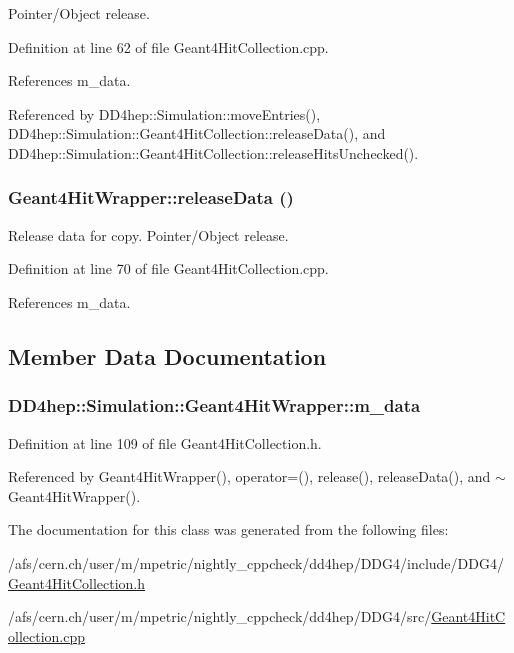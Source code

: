 Pointer/Object release. 

Definition at line 62 of file Geant4HitCollection.cpp.

References m\_\-data.

Referenced by DD4hep::Simulation::moveEntries(), DD4hep::Simulation::Geant4HitCollection::releaseData(), and DD4hep::Simulation::Geant4HitCollection::releaseHitsUnchecked().\hypertarget{class_d_d4hep_1_1_simulation_1_1_geant4_hit_wrapper_acec7d2a18d078071d5714dd4a0c45739}{
\subsubsection[{releaseData}]{ Geant4HitWrapper::releaseData ()}}
\label{class_d_d4hep_1_1_simulation_1_1_geant4_hit_wrapper_acec7d2a18d078071d5714dd4a0c45739}


Release data for copy. Pointer/Object release. 

Definition at line 70 of file Geant4HitCollection.cpp.

References m\_\-data.

\subsection{Member Data Documentation}
\hypertarget{class_d_d4hep_1_1_simulation_1_1_geant4_hit_wrapper_a2344f57f3d02ecd148c2b4893dffe660}{
\subsubsection[{m\_\-data}]{ {\bf DD4hep::Simulation::Geant4HitWrapper::m\_\-data}}}
\label{class_d_d4hep_1_1_simulation_1_1_geant4_hit_wrapper_a2344f57f3d02ecd148c2b4893dffe660}


Definition at line 109 of file Geant4HitCollection.h.

Referenced by Geant4HitWrapper(), operator=(), release(), releaseData(), and $\sim$Geant4HitWrapper().

The documentation for this class was generated from the following files:\begin{DoxyCompactItemize}
\item 
/afs/cern.ch/user/m/mpetric/nightly\_\-cppcheck/dd4hep/DDG4/include/DDG4/\hyperlink{_geant4_hit_collection_8h}{Geant4HitCollection.h}\item 
/afs/cern.ch/user/m/mpetric/nightly\_\-cppcheck/dd4hep/DDG4/src/\hyperlink{_geant4_hit_collection_8cpp}{Geant4HitCollection.cpp}\end{DoxyCompactItemize}
